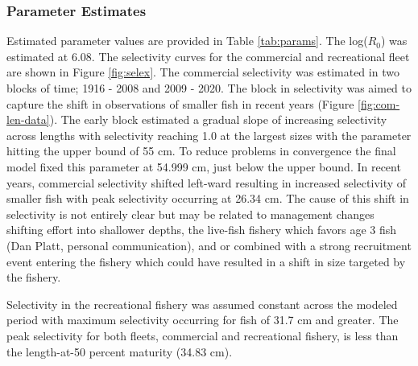 \documentclass[11pt,
  english,
  a4paper,
]{article}
\begin{document}
\leavevmode\tagmcend\tagstructend\par


\hypertarget{parameter-estimates}{%
\subsubsection{Parameter Estimates}\label{parameter-estimates}}

\leavevmode\tagmcend\tagstructend


Estimated parameter values are provided in Table \ref{tab:params}. The log({\(R_0\)\leavevmode\tagmcend\tagstructend}) was estimated at 6.08. The selectivity curves for the commercial and recreational fleet are shown in Figure \ref{fig:selex}. The commercial selectivity was estimated in two blocks of time; 1916 - 2008 and 2009 - 2020. The block in selectivity was aimed to capture the shift in observations of smaller fish in recent years (Figure \ref{fig:com-len-data}). The early block estimated a gradual slope of increasing selectivity across lengths with selectivity reaching 1.0 at the largest sizes with the parameter hitting the upper bound of 55 cm. To reduce problems in convergence the final model fixed this parameter at 54.999 cm, just below the upper bound. In recent years, commercial selectivity shifted left-ward resulting in increased selectivity of smaller fish with peak selectivity occurring at 26.34 cm. The cause of this shift in selectivity is not entirely clear but may be related to management changes shifting effort into shallower depths, the live-fish fishery which favors age 3 fish (Dan Platt, personal communication), and or combined with a strong recruitment event entering the fishery which could have resulted in a shift in size targeted by the fishery.

\leavevmode\tagmcend\tagstructend\par


Selectivity in the recreational fishery was assumed constant across the modeled period with maximum selectivity occurring for fish of 31.7 cm and greater. The peak selectivity for both fleets, commercial and recreational fishery, is less than the length-at-50 percent maturity (34.83 cm).

\leavevmode\tagmcend\tagstructend\par
\end{document}
